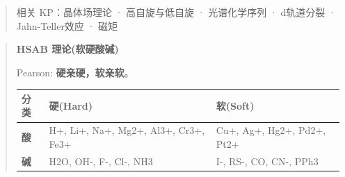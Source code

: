 \begin{quote}
相关 KP：晶体场理论 · 高自旋与低自旋 · 光谱化学序列 · d轨道分裂 · Jahn-Teller效应 · 磁矩
\end{quote}

\begin{quote}
\textbf{HSAB 理论(软硬酸碱)}

Pearson: \textbf{硬亲硬，软亲软}。

{\def\LTcaptype{none} %
\begin{longtable}[]{@{}
  >{\raggedright\arraybackslash}p{}
  >{\raggedright\arraybackslash}p{}
  >{\raggedright\arraybackslash}p{}@{}}
\toprule\noalign{}
\begin{minipage}[b]{\linewidth}\raggedright
分类
\end{minipage} & \begin{minipage}[b]{\linewidth}\raggedright
硬(Hard)
\end{minipage} & \begin{minipage}[b]{\linewidth}\raggedright
软(Soft)
\end{minipage} \\
\midrule\noalign{}
\endhead
\bottomrule\noalign{}
\endlastfoot
\textbf{酸} & H+, Li+, Na+, Mg2+, Al3+, Cr3+, Fe3+ & Cu+, Ag+, Hg2+, Pd2+, Pt2+ \\
\textbf{碱} & H2O, OH-, F-, Cl-, NH3 & I-, RS-, CO, CN-, PPh3 \\
\end{longtable}
}
\end{quote}

